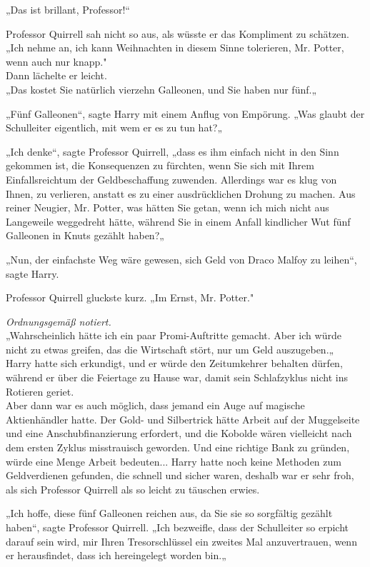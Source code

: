 {„Das ist brillant, Professor!“

Professor Quirrell sah nicht so aus, als wüsste er das Kompliment zu schätzen.\\ „Ich nehme an, ich kann Weihnachten in diesem Sinne tolerieren, Mr. Potter, wenn auch nur knapp."\\ Dann lächelte er leicht.\\ „Das kostet Sie natürlich vierzehn Galleonen, und Sie haben nur fünf.„

„Fünf Galleonen“, sagte Harry mit einem Anflug von Empörung. „Was glaubt der Schulleiter eigentlich, mit wem er es zu tun hat?„

„Ich denke“, sagte Professor Quirrell, „dass es ihm einfach nicht in den Sinn gekommen ist, die Konsequenzen zu fürchten, wenn Sie sich mit Ihrem Einfallsreichtum der Geldbeschaffung zuwenden. Allerdings war es klug von Ihnen, zu verlieren, anstatt es zu einer ausdrücklichen Drohung zu machen. Aus reiner Neugier, Mr. Potter, was hätten Sie getan, wenn ich mich nicht aus Langeweile weggedreht hätte, während Sie in einem Anfall kindlicher Wut fünf Galleonen in Knuts gezählt haben?„

„Nun, der einfachste Weg wäre gewesen, sich Geld von Draco Malfoy zu leihen“, sagte Harry.

Professor Quirrell gluckste kurz. „Im Ernst, Mr. Potter."

\emph{Ordnungsgemäß notiert.}\\ „Wahrscheinlich hätte ich ein paar Promi-Auftritte gemacht. Aber ich würde nicht zu etwas greifen, das die Wirtschaft stört, nur um Geld auszugeben.„\\ Harry hatte sich erkundigt, und er würde den Zeitumkehrer behalten dürfen, während er über die Feiertage zu Hause war, damit sein Schlafzyklus nicht ins Rotieren geriet.\\ Aber dann war es auch möglich, dass jemand ein Auge auf magische Aktienhändler hatte. Der Gold- und Silbertrick hätte Arbeit auf der Muggelseite und eine Anschubfinanzierung erfordert, und die Kobolde wären vielleicht nach dem ersten Zyklus misstrauisch geworden. Und eine richtige Bank zu gründen, würde eine Menge Arbeit bedeuten... Harry hatte noch keine Methoden zum Geldverdienen gefunden, die schnell und sicher waren, deshalb war er sehr froh, als sich Professor Quirrell als so leicht zu täuschen erwies.

„Ich hoffe, diese fünf Galleonen reichen aus, da Sie sie so sorgfältig gezählt haben“, sagte Professor Quirrell. „Ich bezweifle, dass der Schulleiter so erpicht darauf sein wird, mir Ihren Tresorschlüssel ein zweites Mal anzuvertrauen, wenn er herausfindet, dass ich hereingelegt worden bin.„

}
